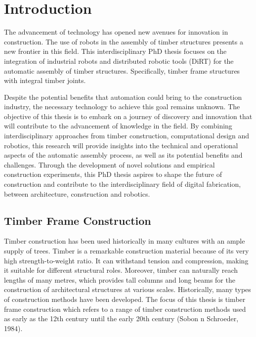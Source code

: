 \chapter{Introduction}

The advancement of technology has opened new avenues for innovation in construction.
The use of robots in the assembly of timber structures presents a new frontier in this field.
This interdisciplinary PhD thesis focuses on the integration of industrial robots and distributed robotic tools (DiRT) for the automatic assembly of timber structures.
Specifically, timber frame structures with integral timber joints. 

Despite the potential benefits that automation could bring to the construction industry, the necessary technology to achieve this goal remains unknown. The objective of this thesis is to embark on a journey of discovery and innovation that will contribute to the advancement of knowledge in the field.
By combining interdisciplinary approaches from timber construction, computational design and robotics, this research will provide insights into the technical and operational aspects of the automatic assembly process, as well as its potential benefits and challenges.
Through the development of novel solutions and empirical construction experiments, this PhD thesis aspires to shape the future of construction and contribute to the interdisciplinary field of digital fabrication, between architecture, construction and robotics.

\section{Timber Frame Construction}

Timber construction has been used historically in many cultures with an ample supply of trees.
Timber is a remarkable construction material because of its very high strength-to-weight ratio.
It can withstand tension and compression, making it suitable for different structural roles. Moreover, timber can naturally reach lengths of many metres, which provides tall columns and long beams for the construction of architectural structures at various scales.
Historically, many types of construction methods have been developed. The focus of this thesis is timber frame construction which refers to a range of timber construction methods used as early as the 12th century until the early 20th century (Sobon n Schroeder, 1984).

